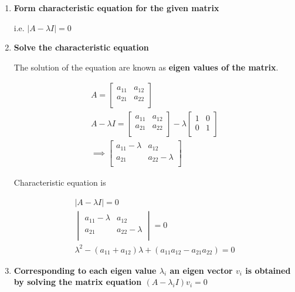 \documentclass[english,course,fleqn]{lecture}
\begin{document}
  \begin{enumerate}
    \item \textbf{Form characteristic equation for the given matrix}

      i.e. $|A-\lambda I| = 0$ 


    \item \textbf{Solve the characteristic equation}

      The solution of the equation are known as \textbf{eigen values of the matrix}.

      \begin{gather*}
        A = \begin{bmatrix}
          a_{11} & a_{12} \\
          a_{21} & a_{22} \\
        \end{bmatrix}\\
        A - \lambda I =  \begin{bmatrix}
          a_{11} & a_{12} \\
          a_{21} & a_{22} \\
          \end{bmatrix} - \lambda \begin{bmatrix}
          1 & 0 \\
          0 & 1 \\
        \end{bmatrix}\\
        \implies \begin{bmatrix}
          a_{11} - \lambda & a_{12} \\
          a_{21} & a_{22} - \lambda \\
        \end{bmatrix}
      \end{gather*}

      Characteristic equation is

      \begin{gather*}
        |A - \lambda I| = 0\\
        \begin{vmatrix}
          a_{11} - \lambda & a_{12} \\
          a_{21} & a_{22} - \lambda \\
        \end{vmatrix} = 0\\
        \lambda^{2} - (a_{11} + a_{12})\lambda + (a_{11}a_{12} - a_{21} a _{22}) = 0
      \end{gather*}

    \item \textbf{Corresponding to each eigen value $\lambda_{i}$ an eigen vector $v_{i}$ is obtained by solving the matrix equation $(A - \lambda_{i}I) v_{i} = 0$}
  \end{enumerate}
\end{document}
